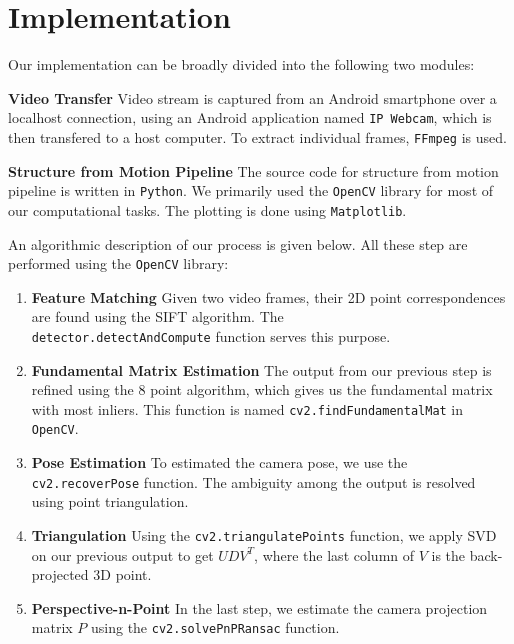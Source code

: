 \documentclass[11pt, a4paper, openany]{article}
\begin{document}
\section{Implementation} Our implementation can be broadly divided into the following two modules:
\begin{description}
\item \textbf{Video Transfer} Video stream is captured from an Android smartphone over a localhost connection, using an Android application named \verb|IP Webcam|, which is then transfered to a host computer. To extract individual frames, \verb|FFmpeg| is used.
\item \textbf{Structure from Motion Pipeline} The source code for structure from motion pipeline is written in \verb|Python|. We primarily used the \verb|OpenCV| library for most of our computational tasks. The plotting is done using \verb|Matplotlib|.

An algorithmic description of our process is given below. All these step are performed using the \verb|OpenCV| library:

\begin{enumerate}
\item \textbf{Feature Matching} Given two video frames, their 2D point correspondences are found using the SIFT algorithm. The \\ \verb|detector.detectAndCompute| function serves this purpose.

\item \textbf{Fundamental Matrix Estimation} The output from our previous step is refined using the 8 point algorithm, which gives us the fundamental matrix with most inliers. This function is named \verb|cv2.findFundamentalMat| in \verb|OpenCV|.

\item \textbf{Pose Estimation} To estimated the camera pose, we use the \verb|cv2.recoverPose| function. The ambiguity among the output is resolved using point triangulation.

\item \textbf{Triangulation} Using the \verb|cv2.triangulatePoints| function, we apply SVD on our previous output to get $UDV^{T}$, where the last column of $V$ is the back-projected 3D point.

\item \textbf{Perspective-n-Point} In the last step, we estimate the camera projection matrix $P$ using the \verb|cv2.solvePnPRansac| function.

\end{enumerate}
\end{description}
\end{document}
